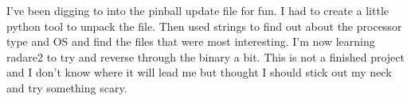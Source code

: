 \def\abstracttitle{Down the Drain: A look into Pinball's Embedded systems}
\def\abstractcomment{Short Talk}
\def\abstractowner{Anna Neal}

\thispagestyle{abstract}

I've been digging to into the pinball update file for fun. I had to create a little python tool to unpack the file. Then used strings to find out about the processor type and OS and find the files that were most interesting. I'm now learning radare2 to try and reverse through the binary a bit. This is not a finished project and I don't know where it will lead me but thought I should stick out my neck and try something scary.
